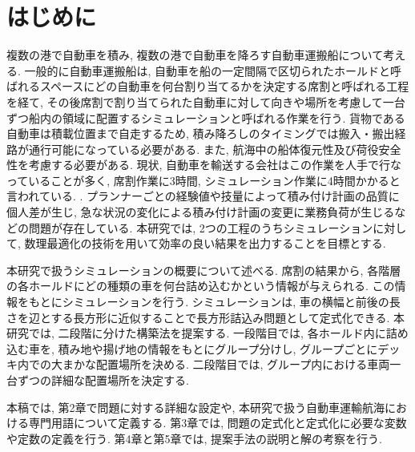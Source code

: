 \chapter{はじめに}

複数の港で自動車を積み, 複数の港で自動車を降ろす自動車運搬船について考える. 
一般的に自動車運搬船は, 自動車を船の一定間隔で区切られたホールドと呼ばれるスペースにどの自動車を何台割り当てるかを決定する席割と呼ばれる工程を経て, その後席割で割り当てられた自動車に対して向きや場所を考慮して一台ずつ船内の領域に配置するシミュレーションと呼ばれる作業を行う. 
貨物である自動車は積載位置まで自走するため, 積み降ろしのタイミングでは搬入・搬出経路が通行可能になっている必要がある. 
また, 航海中の船体復元性及び荷役安全性を考慮する必要がある. 
現状, 自動車を輸送する会社はこの作業を人手で行なっていることが多く, 席割作業に3時間, シミュレーション作業に4時間かかると言われている. \cite{mitsui}. 
プランナーごとの経験値や技量によって積み付け計画の品質に個人差が生じ, 急な状況の変化による積み付け計画の変更に業務負荷が生じるなどの問題が存在している. 
本研究では, 2つの工程のうちシミュレーションに対して, 数理最適化の技術を用いて効率の良い結果を出力することを目標とする. 

本研究で扱うシミュレーションの概要について述べる. 
席割の結果から, 各階層の各ホールドにどの種類の車を何台詰め込むかという情報が与えられる. 
この情報をもとにシミュレーションを行う. 
シミュレーションは, 車の横幅と前後の長さを辺とする長方形に近似することで長方形詰込み問題として定式化できる. 
本研究では, 二段階に分けた構築法を提案する. 
一段階目では, 各ホールド内に詰め込む車を, 積み地や揚げ地の情報をもとにグループ分けし, グループごとにデッキ内での大まかな配置場所を決める. 
二段階目では, グループ内における車両一台ずつの詳細な配置場所を決定する. 

本稿では, 第2章で問題に対する詳細な設定や, 本研究で扱う自動車運輸航海における専門用語について定義する. 
第3章では, 問題の定式化と定式化に必要な変数や定数の定義を行う. 
第4章と第5章では, 提案手法の説明と解の考察を行う. 
